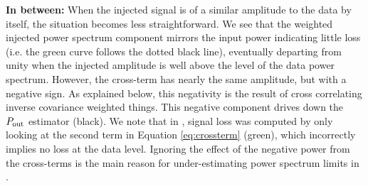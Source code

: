 \documentclass[preprint2,numberedappendix,tighten]{aastex6}  %
\begin{document}
{\bf In between:}
When the injected signal is of a similar amplitude to the data by itself, the situation becomes less straightforward. We see that 
the weighted injected power spectrum component mirrors the input power indicating little loss (i.e. the green curve follows the dotted black line), eventually 
departing from unity when the injected amplitude is well above the level of the data power spectrum. However, 
the cross-term has nearly the same amplitude, but with a negative sign. As explained below, this negativity is the result of cross correlating inverse covariance weighted things.  This negative component drives down the $P_{\rm out}$ estimator (black). We note that in , signal loss was computed by only looking at the second term in Equation \eqref{eq:crossterm} (green), which incorrectly implies no loss at the data level. Ignoring the effect of the negative power from the cross-terms is the main reason for under-estimating power spectrum limits in .

\end{document}
